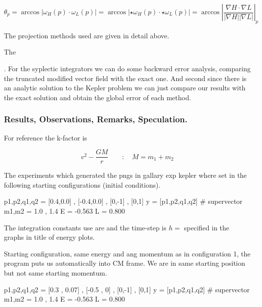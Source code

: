 \documentclass[12pt]{article}
\begin{document}
\begin{equation}\label{eq:angle between level sets}
    \theta_p = \arccos{|\omega_H(p) \cdot \omega_L(p)|} = \arccos|\star \omega_H(p) \cdot \star\omega_L(p)| = \arccos\left| \frac{\nabla H \cdot \nabla L }{|\nabla H| |\nabla L|} \right|_p
\end{equation}

The projection methods used are given in detail above.

The 

. For the syplectic integrators we can do some backward error analysis, comparing the truncated modified vector field with the exact one. And second since there is an analytic solution to the Kepler problem we can just compare our results with the exact solution and obtain the global error of each method. 

\subsubsection{Results, Observations, Remarks, Speculation.}



For reference the k-factor is 

\begin{equation}
    v^2 - \frac{G M}{r}\qquad:\quad M = m_1+m_2
\end{equation}

The experiments which generated the pngs in gallary exp kepler where set in the following starting configurations (initial conditions).

\begin{python}
p1,p2,q1,q2 = [0.4,0.0] , [-0.4,0.0] , [0,-1] , [0,1]
y = [p1,p2,q1,q2] # supervector
m1,m2 = 1.0 , 1.4
E = -0.563
L = 0.800
\end{python}

The integration constants use are  and the time-step is $h =$  specified in the graphs in title of energy plots.

Starting configuration, same energy and ang momentum as in configuration 1, the program puts us automatically into CM frame. We are in same starting position but not same starting momentum.

\begin{python}
p1,p2,q1,q2 = [0.3 , 0.07] , [-0.5 , 0] , [0,-1] , [0,1]
y = [p1,p2,q1,q2] # supervector
m1,m2 = 1.0 , 1.4
E = -0.563
L = 0.800
\end{python}
\end{document}
